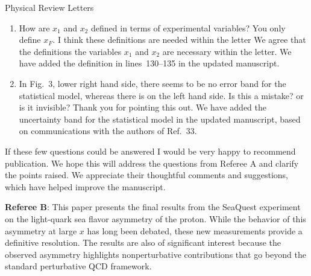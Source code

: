 \documentclass[letterpaper,12pt,oneside,final]{letter}
\makeatletter
\renewenvironment*{displayquote}
  {\begingroup\color{blue}\csq@getcargs{\csq@bdquote{}{}}}
  {\csq@edquote\endgroup}
\makeatother
\begin{document}
\begin{letter}{Physical Review Letters}
\begin{enumerate}
\begin{displayquote}
			      Again I know this is a letter but I am curious about the comparison of the two halves of the data,
			      which are combined. Could a figure not be put in `end matter'?
		      \end{displayquote}
		      Thank you for the suggestion. We agree that comparing the two halves of the data is important.
		      We have added a figure to the end matter as suggested.
		\item \begin{displayquote}
			      How are $x_1$ and $x_2$ defined in terms of experimental variables?
			      You only define $x_F$. I think these definitions are needed within the letter
		      \end{displayquote}
		      We agree that the definitions the variables $x_1$ and $x_2$ are necessary within the letter.
		      We have added the definition in lines~130--135 in the updated manuscript.
		\item \begin{displayquote}
			      In Fig.~3, lower right hand side, there seems to be no error band for the statistical model,
			      whereas there is on the left hand side. Is this a mistake? or is it invisible?
		      \end{displayquote}
		      Thank you for pointing this out.
		      We have added the uncertainty band for the statistical model in the updated manuscript,
			  based on communications with the authors of Ref.~33.
	\end{enumerate}
	\begin{displayquote}
		If these few questions could be answered I would be very happy to recommend publication.
	\end{displayquote}
	We hope this will address the questions from Referee A and clarify the points raised.
	We appreciate their thoughtful comments and suggestions,
	which have helped improve the manuscript.

	\hrulefill

	\textbf{Referee B}:
	\begin{displayquote}
		This paper presents the final results from the SeaQuest experiment on the light-quark sea flavor asymmetry of the proton.
		While the behavior of this asymmetry at large $x$ has long been debated,
		these new measurements provide a definitive resolution.
		The results are also of significant interest because the observed asymmetry highlights
		nonperturbative contributions that go beyond the standard perturbative QCD framework.


\end{displayquote}
\end{letter}
\end{document}

